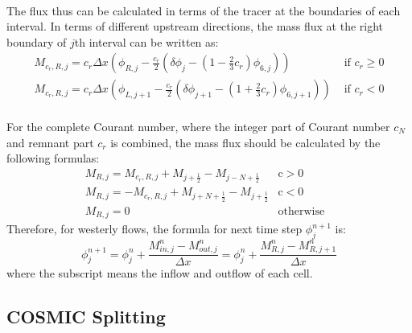 \paragraph{}
The flux thus can be calculated in terms of the tracer at the boundaries of each interval. In terms of different upstream directions, the mass flux at the right boundary of $j$th interval can be written as:
\begin{eqnarray} \label{eq:2.10}
M_{c_r,R,j} = c_r \Delta x (\phi_{R,j}-\frac{c_r}{2}(\delta \phi_j-(1-\frac{2}{3} c_r)\phi_{6,j})) & \text{ if $c_r$}\geqslant 0 \nonumber \\
M_{c_r,R,j} = c_r \Delta x (\phi_{L,j+1}-\frac{c_r}{2}(\delta \phi_{j+1}-(1+\frac{2}{3} c_r)\phi_{6,j+1})) & \text{ if  $c_r$} < 0
\end{eqnarray}
\paragraph{}
For the complete Courant number, where the integer part of Courant number $c_N$ and remnant part $c_r$ is combined, the mass flux should be calculated by the following formulas:
\begin{eqnarray} \label{eq:2.11}
M_{R,j} = M_{c_r,R,j} + M_{j+\frac{1}{2}}-M_{j-N+\frac{1}{2}} & \text{c}>0 &\nonumber \\
M_{R,j} = -M_{c_r,R,j} +M_{j+N+\frac{1}{2}}- M_{j+\frac{1}{2}} & \text{c}<0 & \\
M_{R,j} = 0 & \text{otherwise} \nonumber 
\end{eqnarray}
Therefore, for westerly flows, the formula for next time step $\phi^{n+1}_j$ is: 
\begin{equation} \label{eq:2.12}
\phi^{n+1}_j = \phi^n_j + \frac{M^n_{in,j} - M^n_{out,j}}{\Delta x} = \phi^n_j + \frac{M^n_{R,j} - M^n_{R,j+1}}{\Delta x}
\end{equation}
where the subscript means the inflow and outflow of each cell.

\subsection{COSMIC Splitting}
\label{sec:COSMIC}
